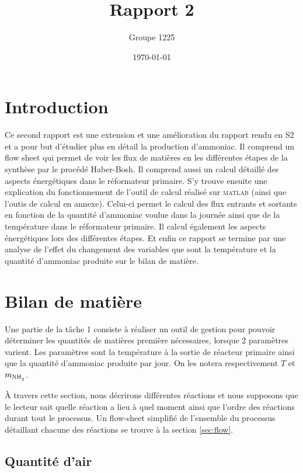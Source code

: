 \documentclass[a4paper, oneside, 12pt]{article}
\title{Rapport 2}
\author{Groupe 1225}
\date{\today}
\begin{document}
\maketitle

\section{Introduction}

Ce second rapport est une extension et une amélioration du rapport rendu 
en S2 et a pour but d'étudier plus en détail la production d'ammoniac. 
Il comprend un flow sheet qui permet de voir les flux de matières en 
les différentes étapes de la synthèse par le procédé Haber-Bosh. 
Il comprend aussi un calcul détaillé des aspects énergétiques dans le réformateur primaire.
S’y trouve ensuite une explication du fonctionnement de l’outil de calcul
réalisé sur \textsc{matlab} (ainsi que l'outis de calcul en annexe).
Celui-ci permet le calcul des flux entrants et sortants en fonction 
de la quantité d'ammoniac voulue dans la journée ainsi que de la 
température dans le réformateur primaire. Il calcul également les aspects énergétiques 
lors des différentes étapes. 
Et enfin ce rapport se termine par une analyse de l'effet du changement 
des variables que sont la température et la quantité d'ammoniac produite 
sur le bilan de matière.

\section{Bilan de matière}
\label{sec:bilan_matiere}

Une partie de la t\^ache 1 consiste à réaliser un outil de gestion
pour pouvoir déterminer les quantités de matières première nécessaires,
lorsque 2 paramètres varient. 
Les paramètres sont la température à la sortie de réacteur primaire ainsi
que la quantité d'ammoniac produite par jour. 
On les notera respectivement $T$ et $m_{\ce{NH3}}$.

À travers cette section, nous décrirons différentes réactions et nous 
supposons que le lecteur sait quelle réaction a lieu à quel moment ainsi 
que l'ordre des réactions durant tout le processus.
Un flow-sheet simplifié de l'ensemble du processus détaillant chacune
des réactions se trouve à la section \ref{sec:flow}.

\subsection{Quantité d'air}
\end{document}
